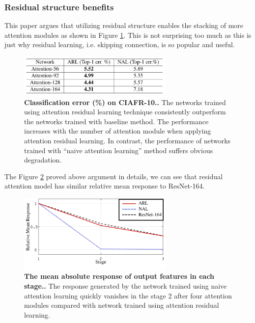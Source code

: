 \documentclass{article}
\newcommand{\mycaption}[2]{\caption[#1]{\textbf{#1.} #2}}
\begin{document}
\begin{multicols}{2}
\subsubsection{Residual structure benefits}
This paper argues that utilizing residual structure enables the stacking of more attention modules as shown in Figure \ref{fig:cifar10_residual}. This is not surprising too much as this is just why residual learning, i.e. skipping connection, is so popular and useful.
\begin{figure}[H] 
\includegraphics[width=3in]{imgs/cifar10_residual.png}  
\mycaption{Classification error (\%) on CIAFR-10.}{The networks trained using attention residual learning technique consistently outperform the networks trained with baseline method. The performance increases with the number of attention module when applying attention residual learning. In contrast, the performance of networks trained with “naive attention learning” method suffers obvious degradation.}  
\label{fig:cifar10_residual}
\end{figure}
The Figure \ref{fig:cifar10_stages} proved above argument in details, we can see that residual attention model has similar relative mean response to ResNet-164.
\begin{figure}[H] 
\includegraphics[width=3in]{imgs/cifar10_stages.png}  
\mycaption{The mean absolute response of output features in each stage.}{The response generated by the network trained using naive attention learning quickly vanishes in the stage 2 after four attention modules compared with network trained using attention residual learning.}  
\label{fig:cifar10_stages}
\end{figure}


\end{multicols}
\end{document}
